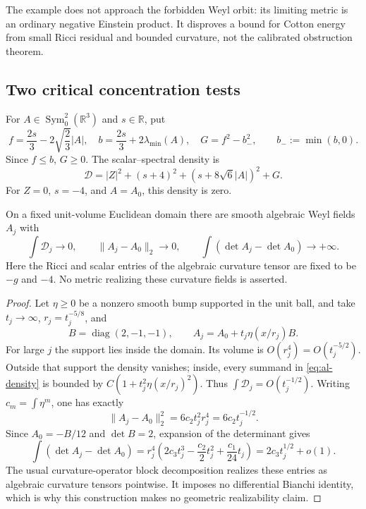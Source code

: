 The example does not approach the forbidden Weyl orbit: its limiting
metric is an ordinary negative Einstein product.  It disproves a bound
for Cotton energy from small Ricci residual and bounded curvature, not
the calibrated obstruction theorem.

\subsection{Two critical concentration tests}

For $A\in\operatorname{Sym}^2_0(\mathbb R^3)$ and $s\in\mathbb R$, put
\[
 f=\frac{2s}{3}-2\sqrt{\frac23}|A|,
 \quad b=\frac{2s}{3}+2\lambda_{\min}(A),
 \quad G=f^2-b_-^2,\qquad b_-:=\min(b,0).
\]
Since $f\le b$, $G\ge0$.  The scalar--spectral density is
\begin{equation}\label{eq:al-density}
 \mathscr D=|Z|^2+(s+4)^2+(s+8\sqrt6|A|)^2+G.
\end{equation}
For $Z=0$, $s=-4$, and $A=A_0$, this density is zero.

\begin{proposition}
\label{prop:al-cubic-concentration}
On a fixed unit-volume Euclidean domain there are smooth algebraic Weyl
fields $A_j$ with
\[
 \int\mathscr D_j\longrightarrow0,
 \qquad \|A_j-A_0\|_2\longrightarrow0,
 \qquad \int(\det A_j-\det A_0)\longrightarrow+\infty.
\]
Here the Ricci and scalar entries of the algebraic curvature tensor are
fixed to be $-g$ and $-4$.  No metric realizing these curvature fields is
asserted.
\end{proposition}

\begin{proof}
Let $\eta\ge0$ be a nonzero smooth bump supported in the unit ball, and
take $t_j\to\infty$, $r_j=t_j^{-5/8}$, and
\[
 B=\operatorname{diag}(2,-1,-1),\qquad
 A_j=A_0+t_j\eta(x/r_j)B.
\]
For large $j$ the support lies inside the domain.  Its volume is
$O(r_j^4)=O(t_j^{-5/2})$.  Outside that support the density vanishes;
inside, every summand in \eqref{eq:al-density} is bounded by
$C(1+t_j^2\eta(x/r_j)^2)$.  Thus $\int\mathscr D_j=O(t_j^{-1/2})$.
Writing $c_m=\int\eta^m$, one has exactly
\[
 \|A_j-A_0\|_2^2=6c_2t_j^2r_j^4=6c_2t_j^{-1/2}.
\]
Since $A_0=-B/12$ and $\det B=2$, expansion of the determinant gives
\[
 \int(\det A_j-\det A_0)
 =r_j^4\left(2c_3t_j^3-\frac{c_2}2t_j^2
                         +\frac{c_1}{24}t_j\right)
 =2c_3t_j^{1/2}+o(1).
\]
The usual curvature-operator block decomposition realizes these entries
as algebraic curvature tensors pointwise.  It imposes no differential
Bianchi identity, which is why this construction makes no geometric
realizability claim.
\end{proof}

